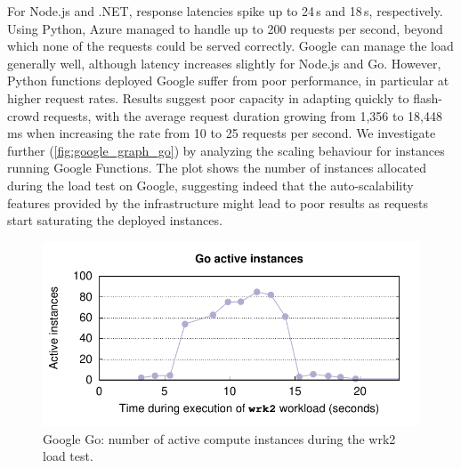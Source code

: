 For Node.js and .NET, response latencies spike up to 24\,s and 18\,s, respectively. %
Using Python, Azure managed to handle up to 200 requests per second, beyond which none of the requests could be served correctly.
Google can manage the load generally well, although latency increases slightly for Node.js and Go. 
However, Python functions deployed Google suffer from poor performance, in particular at higher request rates. 
Results suggest poor capacity in adapting quickly to flash-crowd requests, with the average request duration growing from 1,356 to 18,448\,ms when increasing the rate from 10 to 25 requests per second. 
We investigate further (\autoref{fig:google_graph_go}) by analyzing the scaling behaviour for instances running Google Functions.
The plot shows the number of instances allocated during the load test on Google, suggesting indeed that the auto-scalability features provided by the infrastructure might lead to poor results as requests start saturating the deployed instances.

\begin{figure}[!t]
\centering
\includegraphics[scale=0.7]{bilder/go_instances/go_instances}
\caption{Google Go: number of active compute instances during the wrk2 load test.}
\label{fig:google_graph_go}
\end{figure}

